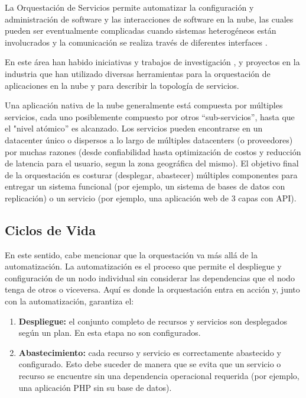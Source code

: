         La Orquestación de Servicios permite automatizar la configuración y administración de software y las interacciones de software en la nube, las cuales pueden ser eventualmente complicadas cuando sistemas heterogéneos están involucrados y la comunicación se realiza través de diferentes interfaces \citeyear{Katsaros2016-bj}. 
        
        En este área han habido iniciativas y trabajos de investigación \cite{Antonescu2012-ml,Juve2011-ob,Liu2011-vw,Binz2012-ru}, y proyectos en la industria \cite{Ibm2016-xb,Ibm2013-az} que han utilizado diversas herramientas para la orquestación de aplicaciones en la nube y para describir la topología de servicios.
        
        Una aplicación nativa de la nube generalmente está compuesta por múltiples servicios, cada uno posiblemente compuesto por otros “sub-servicios”, hasta que el "nivel atómico” es alcanzado. Los servicios pueden encontrarse en un datacenter único o dispersos a lo largo de múltiples datacenters (o proveedores) por muchas razones (desde confiabilidad hasta optimización de costos y reducción de latencia para el usuario, segun la zona geográfica del mismo). El objetivo final de la orquestación es costurar (desplegar, abastecer) múltiples componentes para entregar un sistema funcional (por ejemplo, un sistema de bases de datos con replicación) o un servicio (por ejemplo, una aplicación web de 3 capas con API).
	    
	    \subsection{Ciclos de Vida}
        En este sentido, cabe mencionar que la orquestación va más allá de la automatización. La automatización es el proceso que permite el despliegue y configuración de un nodo individual sin considerar las dependencias que el nodo tenga de otros o viceversa. Aquí es donde la orquestación entra en acción y, junto con la automatización, garantiza el:
        
        \begin{enumerate}
            \item \textbf{Despliegue: }el conjunto completo de recursos y servicios son desplegados según un plan. En esta etapa no son configurados.
            
            \item \textbf{Abastecimiento:} cada recurso y servicio es correctamente abastecido y configurado. Esto debe suceder de manera que se evita que un servicio o recurso se encuentre sin una dependencia operacional requerida (por ejemplo, una aplicación PHP sin su base de datos).
        \end{enumerate}


